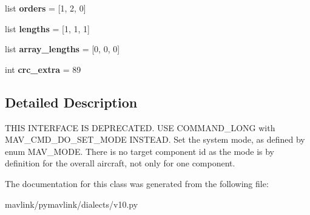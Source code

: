 \begin{DoxyCompactItemize}
\item 
\mbox{\label{classpymavlink_1_1dialects_1_1v10_1_1MAVLink__set__mode__message_a3dd1992fdefad6a98156c700066d4593}} 
list {\bfseries orders} = \mbox{[}1, 2, 0\mbox{]}
\item 
\mbox{\label{classpymavlink_1_1dialects_1_1v10_1_1MAVLink__set__mode__message_aa6b04766d19e90dfdbe8172b6906d49e}} 
list {\bfseries lengths} = \mbox{[}1, 1, 1\mbox{]}
\item 
\mbox{\label{classpymavlink_1_1dialects_1_1v10_1_1MAVLink__set__mode__message_a24a15a7ace135dc01fe97b93e381cfeb}} 
list {\bfseries array\+\_\+lengths} = \mbox{[}0, 0, 0\mbox{]}
\item 
\mbox{\label{classpymavlink_1_1dialects_1_1v10_1_1MAVLink__set__mode__message_a5eac183cdb64ace1fb6d7d4a4d65cac1}} 
int {\bfseries crc\+\_\+extra} = 89
\end{DoxyCompactItemize}


\subsection{Detailed Description}
\begin{DoxyVerb}THIS INTERFACE IS DEPRECATED. USE COMMAND_LONG with
MAV_CMD_DO_SET_MODE INSTEAD. Set the system mode, as defined
by enum MAV_MODE. There is no target component id as the mode
is by definition for the overall aircraft, not only for one
component.
\end{DoxyVerb}
 

The documentation for this class was generated from the following file\+:\begin{DoxyCompactItemize}
\item 
mavlink/pymavlink/dialects/v10.\+py\end{DoxyCompactItemize}

